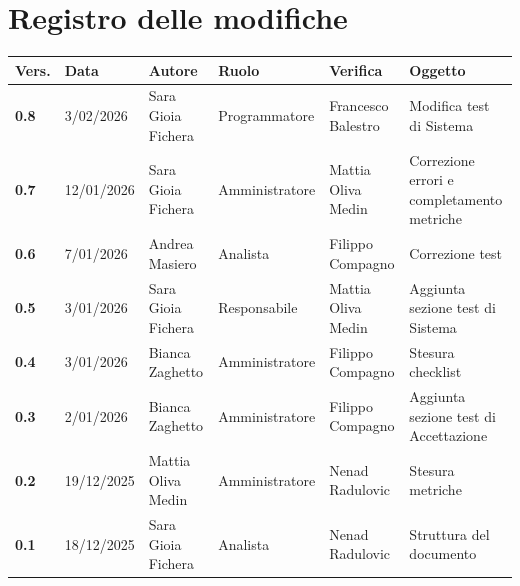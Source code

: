 \documentclass[a4paper,12pt]{article}
\begin{document}
    

    \section*{Registro delle modifiche} {
        \begin{table}[h!]
                \begin{tabularx}{\textwidth}{|l|l|l|l|L|L|}
                \hline
                \textbf{Vers.} & \textbf{Data} & \textbf{Autore} & \textbf{Ruolo} & \textbf{Verifica} & \textbf{Oggetto} \\
                \hline
                \textbf{0.8} & 3/02/2026 & Sara Gioia Fichera & Programmatore & Francesco Balestro & Modifica test di Sistema\\
                \hline
                \textbf{0.7} & 12/01/2026 & Sara Gioia Fichera & Amministratore & Mattia Oliva Medin & Correzione errori e completamento metriche \\
                \hline
                \textbf{0.6} & 7/01/2026 & Andrea Masiero & Analista & Filippo Compagno & Correzione test \\
                \hline
                \textbf{0.5} & 3/01/2026 & Sara Gioia Fichera & Responsabile & Mattia Oliva Medin & Aggiunta sezione test di Sistema \\
                \hline
                \textbf{0.4} & 3/01/2026 & Bianca Zaghetto & Amministratore & Filippo Compagno & Stesura checklist \\
                \hline
                \textbf{0.3} & 2/01/2026 & Bianca Zaghetto & Amministratore & Filippo Compagno & Aggiunta sezione test di Accettazione \\
                \hline
                \textbf{0.2} & 19/12/2025 & Mattia Oliva Medin & Amministratore & Nenad Radulovic & Stesura metriche\\
                \hline
                \textbf{0.1} & 18/12/2025 & Sara Gioia Fichera & Analista & Nenad Radulovic & Struttura del documento \\
                \hline
            \end{tabularx}
        \end{table}
    }
    \newpage
    
    \tableofcontents
    \newpage

    \listoffigures
    \newpage

    \listoftables
    \newpage
    
\end{document}
